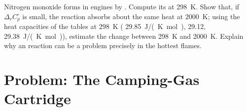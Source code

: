 \begin{exercise}[$\star\star\star$]\label{exo:b2:reaction-enthalpy:12}
Nitrogen monoxide forms in engines by .
Compute its  at \qty{298}{K}. Show that, if
$\Delta_r C_p^\circ$ is small, the reaction absorbs about the same heat at
\qty{2000}{K}; using the heat capacities of the tables at \qty{298}{K}
( \qty{29.85}{J/(K.mol)},  29.12, 
\qty{29.38}{J/(K.mol)}), estimate the change between
\qty{298}{K} and \qty{2000}{K}. Explain why an  reaction can be
a problem precisely in the hottest flames.
\end{exercise}

\section{Problem: The Camping-Gas Cartridge}

